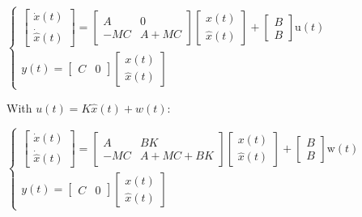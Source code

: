\documentclass{article}
\begin{document}
\begin{spacing}{1.2}
$
\left\{
\begin{array}{l}
\left[ \begin{array}{c}{\dot{x}(t)} \\ {\dot{\hat{x}}(t)}\end{array}\right]=\left[ \begin{array}{cc}{A} & {0} \\ {-M C} & {A+M C}\end{array}\right] \left[ \begin{array}{l}{x(t)} \\ {\hat{x}(t)}\end{array}\right]+\left[ \begin{array}{l}{B} \\ {B}\end{array}\right] \mathrm{u}(t)\\
y(t)=\left[ \begin{array}{ll}{C} & {0}\end{array}\right] \left[ \begin{array}{l}{x(t)} \\ {\hat{x}(t)}\end{array}\right]
\end{array}
\right.
$

With $u(t)=K \hat{x}(t)+w(t)$:

{
	\small
$
\left\{
\begin{array}{l}
\left[ \begin{array}{c}{\dot{x}(t)}
	                   \\
	{\dot{\hat{x}}(t)}
\end{array}\right]=\left[ \begin{array}{cc}{A} & {BK} \\ {-M C} & {A+M C+BK}\end{array}\right] \left[ \begin{array}{l}{x(t)} \\ {\hat{x}(t)}\end{array}\right]+\left[ \begin{array}{l}{B} \\ {B}\end{array}\right] \mathrm{w}(t)\\
y(t)=\left[ \begin{array}{ll}{C} & {0}\end{array}\right] \left[ \begin{array}{l}{x(t)} \\ {\hat{x}(t)}\end{array}\right]
\end{array}
\right.
$
}


\end{spacing}
\end{document}
